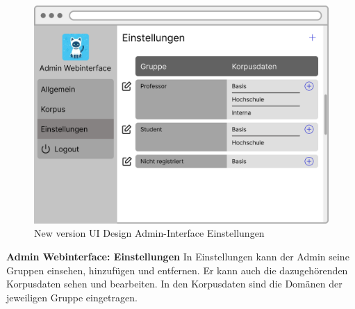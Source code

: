 \begin{figure}[H]
    \centering
    \includegraphics[width=1.0\textwidth]{bilder/new vers. UI Design/Einstellungen/Einstellungen (1).png}
    \caption{New version UI Design Admin-Interface Einstellungen}
    \label{fig:New version UI Design Admin-Interface Einstellungen}
\end{figure}
\noindent \textbf{Admin Webinterface: Einstellungen} \newline
In Einstellungen kann der Admin seine Gruppen einsehen, hinzufügen und entfernen. Er kann auch
die dazugehörenden Korpusdaten sehen und bearbeiten. In den Korpusdaten sind die Domänen der jeweiligen Gruppe eingetragen.

